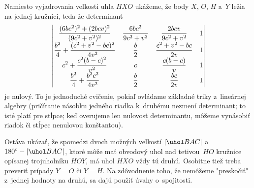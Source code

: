 {Namiesto vyjadrovania veľkosti uhla $HXO$ ukážeme, že body $X$, $O$, $H$ a~$Y$ ležia na jednej kružnici, teda že determinant
$$
\vmatrix
\displaystyle\frac{(6bc^2)^2+(2bcv)^2}{(9c^2+v^2)^2} & \displaystyle\frac{6bc^2}{9c^2+v^2} & \displaystyle\frac{2bcv}{9c^2+v^2} & 1 \\
\displaystyle\frac{b^2}4+\frac{(c^2+v^2-bc)^2}{4v^2} & \displaystyle\frac b2               & \displaystyle\frac{c^2+v^2-bc}{2v} & 1 \\
\displaystyle c^2+\frac{c^2(b-c)^2}{v^2}              & \displaystyle c                      & \displaystyle\frac{c(b-c)}v        & 1 \\
\displaystyle\frac{b^2}4+\frac{b^2c^2}{4v^2}         & \displaystyle\frac b2               & \displaystyle\frac{bc}{2v}         & 1
\endvmatrix
$$
je nulový. To je jednoduché cvičenie, pokiaľ ovládame základné triky z~lineárnej algebry (pričítanie násobku jedného riadka k~druhému nezmení determinant; to isté platí pre stĺpce; keď overujeme len nulovosť determinantu, môžeme vynásobiť riadok či stĺpec nenulovou konštantou).

Ostáva ukázať, že spomedzi dvoch možných veľkostí $|\uhol BAC|$ a~$180^\circ-|\uhol BAC|$, ktoré môže mať obvodový uhol nad tetivou~$HO$ kružnice opísanej trojuholníku $HOY$, má uhol $HXO$ vždy tú druhú. Osobitne tiež treba preveriť prípady $Y=O$ či $Y=H$. Na zdôvodnenie toho, že nemôžeme "preskočiť" z~jednej hodnoty na druhú, sa dajú použiť úvahy o~spojitosti.
}

